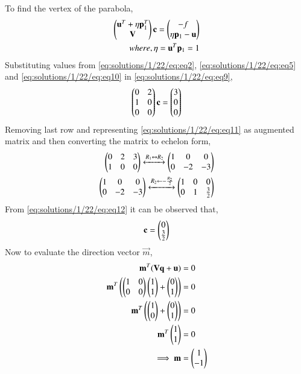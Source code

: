 To find the vertex of the parabola,
\begin{align}
    \begin{pmatrix}\mathbf{u}^T+\eta \mathbf{p}_1^T \\ \mathbf{V}\end{pmatrix}\mathbf{c} = \begin{pmatrix}-f \\ \eta \mathbf{p}_1-\mathbf{u}\end{pmatrix} \label{eq:solutions/1/22/eq:eq9} \\
    where, \eta = \mathbf{u}^T\mathbf{p}_1 = 1 \label{eq:solutions/1/22/eq:eq10}
\end{align}
Substituting values from \eqref{eq:solutions/1/22/eq:eq2}, \eqref{eq:solutions/1/22/eq:eq5} and \eqref{eq:solutions/1/22/eq:eq10} in \eqref{eq:solutions/1/22/eq:eq9}, 
\begin{align}
    \begin{pmatrix}0 & 2 \\ 1 & 0 \\ 0 & 0\end{pmatrix}\mathbf{c}=\begin{pmatrix}3 \\ 0 \\ 0\end{pmatrix} \label{eq:solutions/1/22/eq:eq11}
\end{align}
Removing last row and representing \eqref{eq:solutions/1/22/eq:eq11} as augmented matrix and then converting the matrix to echelon form,
\begin{align}
    \begin{pmatrix}0 & 2 & 3 \\ 1 & 0 & 0\end{pmatrix} \xleftrightarrow[]{R_1\leftrightarrow R_2} \begin{pmatrix}1 & 0 & 0 \\ 0 & -2 & -3\end{pmatrix}\\
    \begin{pmatrix}1 & 0 & 0 \\ 0 & -2 & -3\end{pmatrix} \xleftrightarrow[]{R_2\leftarrow -\frac{R_2}{2}} \begin{pmatrix}1 & 0 & 0 \\ 0 & 1 & \frac{3}{2}\end{pmatrix}\label{eq:solutions/1/22/eq:eq12}
\end{align}
From \eqref{eq:solutions/1/22/eq:eq12} it can be observed that,
\begin{align}
    \mathbf{c} = \begin{pmatrix}0 \\ \frac{3}{2}\end{pmatrix} \label{eq:solutions/1/22/eq:eq13}
\end{align}
Now to evaluate the direction vector $\vec{m}$,
\begin{align}
    \mathbf{m}^T(\mathbf{V}\mathbf{q} + \mathbf{u}) &= 0 \\
    \mathbf{m}^T\begin{pmatrix}\begin{pmatrix}1 & 0 \\ 0 & 0\end{pmatrix}\begin{pmatrix}1 \\ 1\end{pmatrix} +\begin{pmatrix}0 \\ 1\end{pmatrix}\end{pmatrix} &= 0 \\
    \mathbf{m}^T\begin{pmatrix}\begin{pmatrix}1 \\ 0\end{pmatrix} +\begin{pmatrix}0 \\ 1\end{pmatrix}\end{pmatrix} &= 0 \\
    \mathbf{m}^T\begin{pmatrix}1 \\ 1\end{pmatrix} &= 0 \\
    \implies \mathbf{m} &= \begin{pmatrix}1 \\ -1\end{pmatrix} \label{eq:solutions/1/22/eq:eq14}
\end{align}
